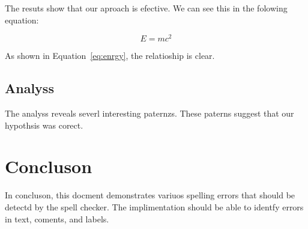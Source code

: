 \documentclass{article}
\begin{document}
The resuts show that our aproach is efective.
We can see this in the folowing equation:

\begin{equation}
    E = mc^2 \label{eq:enrgy}
\end{equation}

As shown in Equation~\ref{eq:enrgy}, the relatioship is clear.

\subsection{Analyss}

The analyss reveals severl interesting paternzs.
These paterns suggest that our hypothsis was corect.


\section{Concluson}

In concluson, this docment demonstrates variuos spelling errors
that should be detectd by the spell checker. The implimentation
should be able to identfy errors in text, coments, and labels.



\end{document}
